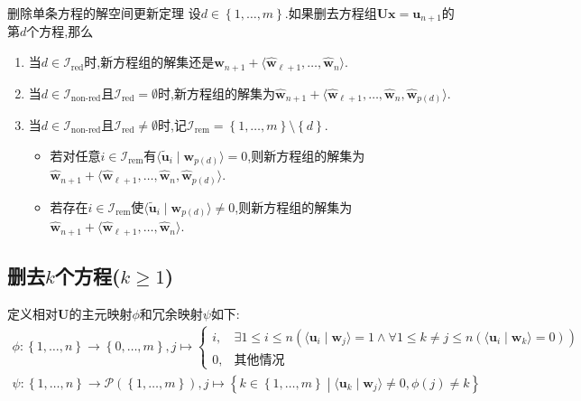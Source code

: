 \begin{theorem}{删除单条方程的解空间更新定理}{}
	设$d\in\left\{1,\ldots,m\right\}$.如果删去方程组$\boldsymbol{U}\boldsymbol{x}=\boldsymbol{u}_{n+1}$的第$d$个方程,那么
	\begin{enumerate}
		\item 当$d\in\mathcal{I}_{\text{red}}$时,新方程组的解集还是$\hat{\boldsymbol{w}}_{n+1}+\langle\hat{\boldsymbol{w}}_{\ell+1},\ldots,\hat{\boldsymbol{w}}_{n}\rangle$.
		\item 当$d\in\mathcal{I}_{\text{non-red}}$且$\mathcal{I}_{\text{red}}=\emptyset$时,新方程组的解集为$\hat{\boldsymbol{w}}_{n+1}+\langle\hat{\boldsymbol{w}}_{\ell+1},\ldots,\hat{\boldsymbol{w}}_{n},\hat{\boldsymbol{w}}_{p\left(d\right)}\rangle$.
		\item 当$d\in\mathcal{I}_{\text{non-red}}$且$\mathcal{I}_{\text{red}}\neq\emptyset$时,记$\mathcal{I}_{\text{rem}}=\left\{1,\ldots,m\right\}\setminus\left\{d\right\}$.
		\begin{itemize}
			\item 若对任意$i\in\mathcal{I}_{\text{rem}}$有$\langle\tilde{\boldsymbol{u}}_{i}\mid\boldsymbol{w}_{p\left(d\right)}\rangle=0$,则新方程组的解集为$\hat{\boldsymbol{w}}_{n+1}+\langle\hat{\boldsymbol{w}}_{\ell+1},\ldots,\hat{\boldsymbol{w}}_{n},\hat{\boldsymbol{w}}_{p\left(d\right)}\rangle$.
			\item 若存在$i\in\mathcal{I}_{\text{rem}}$使$\langle\tilde{\boldsymbol{u}}_{i}\mid\boldsymbol{w}_{p\left(d\right)}\rangle\neq 0$,则新方程组的解集为$\hat{\boldsymbol{w}}_{n+1}+\langle\hat{\boldsymbol{w}}_{\ell+1},\ldots,\hat{\boldsymbol{w}}_{n}\rangle$.
		\end{itemize}
	\end{enumerate}
\end{theorem}

\subsection*{删去$k$个方程($k\geq 1$)}

定义相对$\boldsymbol{U}$的主元映射$\phi$和冗余映射$\psi$如下:
\begin{gather*}
	\phi:\left\{1,\ldots,n\right\}\to\left\{0,\ldots,m\right\},j\mapsto
	\begin{cases}
		i,&\exists 1\leq i\leq n\left(\langle\boldsymbol{u}_{i}\mid\boldsymbol{w}_{j}\rangle=1\wedge\forall 1\leq k\neq j\leq n\left(\langle\boldsymbol{u}_{i}\mid\boldsymbol{w}_{k}\rangle=0\right)\right)\\
		0,&\text{其他情况}
	\end{cases}\\
	\psi:\left\{1,\ldots,n\right\}\to\mathcal{P}\left(\left\{1,\ldots,m\right\}\right),j\mapsto\left\{k\in\left\{1,\ldots,m\right\}\middle|\langle\boldsymbol{u}_{k}\mid\boldsymbol{w}_{j}\rangle\neq 0,\phi\left(j\right)\neq k\right\}
\end{gather*}

